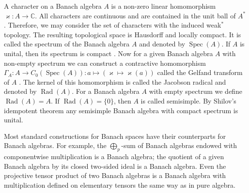 A character on a Banach algebra $A$ is a non-zero linear homomorphism
$\varkappa:A\to\mathbb{C}$. All characters are continuous and are contained in
the unit ball of $A^*$  \cite[theorem 1.2.6]{HelBanLocConvAlg}. Therefore, we
may consider the set of characters with the induced weak$^*$ topology. The
resulting topological space is Hausdorff and locally compact. It is called the
spectrum of the Banach algebra $A$ and denoted by $\operatorname{Spec}(A)$. If $A$
is unital, then its spectrum is compact \cite[theorem 1.2.50]{HelBanLocConvAlg}. Now for a given Banach algebra $A$ with non-empty spectrum we can
construct a contractive homomorphism $\Gamma_A:A\to
C_0(\operatorname{Spec}(A)):a\mapsto(\varkappa\mapsto \varkappa(a))$ called the
Gelfand transform of $A$ \cite[theorem 4.2.11]{HelBanLocConvAlg}. The kernel
of this homomorphism is called the Jacobson radical and denoted by
$\operatorname{Rad}(A)$. For a Banach algebra $A$ with empty spectrum we define
$\operatorname{Rad}(A)=A$. If $\operatorname{Rad}(A)= \{0 \}$, then $A$ is
called semisimple. By Shilov's idempotent theorem \cite[section 3.5]{KaniBanAlg} any semisimple Banach algebra with compact spectrum is unital.

Most standard constructions for Banach spaces have their counterparts for
Banach algebras. For example, the $\bigoplus_p$-sum of Banach algebras endowed with
componentwise multiplication is a Banach algebra; the quotient of a given Banach
algebra by its closed two-sided ideal is a Banach algebra. Even the projective tensor
product of two Banach algebras is a Banach algebra with multiplication defined
on elementary tensors the same way as in pure algebra.

